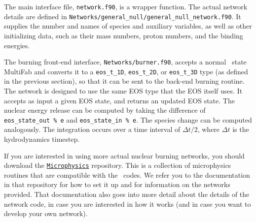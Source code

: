 The main interface file, {\tt network.f90}, is a wrapper function. The 
actual network details are defined in {\tt Networks/general\_null/general\_null\_network.f90}.
It supplies the number and names of species and auxiliary variables, as
well as other initializing data, such as their mass numbers, proton numbers, and the binding
energies.

The burning front-end interface, {\tt Networks/burner.f90}, accepts a normal 
\castro\ state MultiFab and converts it to a 
{\tt eos\_t\_1D}, {\tt eos\_t\_2D}, or {\tt eos\_t\_3D} type (as defined 
in the previous section), so that it can be sent to the back-end burning routine. 
The network is designed to use the same EOS type that the EOS itself uses. It 
accepts as input a given EOS state, and returns an updated EOS state. The 
nuclear energy release can be computed by taking the difference of 
{\tt eos\_state\_out \% e} and {\tt eos\_state\_in \% e}. The species 
change can be computed analogously. The integration occurs over a 
time interval of $\Delta t/2$, where $\Delta t$ is the hydrodynamics timestep.

If you are interested in using more actual nuclear burning networks,
you should download the \href{https://github.com/BoxLib-Codes/Microphysics}{\tt Microphysics} 
repository. This is a collection of microphysics routines that are compatible with the 
\boxlib\ codes. We refer you to the documentation in that repository for how to set it up 
and for information on the networks provided. That documentation 
also goes into more detail about the details of the network code, in case you are interested in 
how it works (and in case you want to develop your own network).
